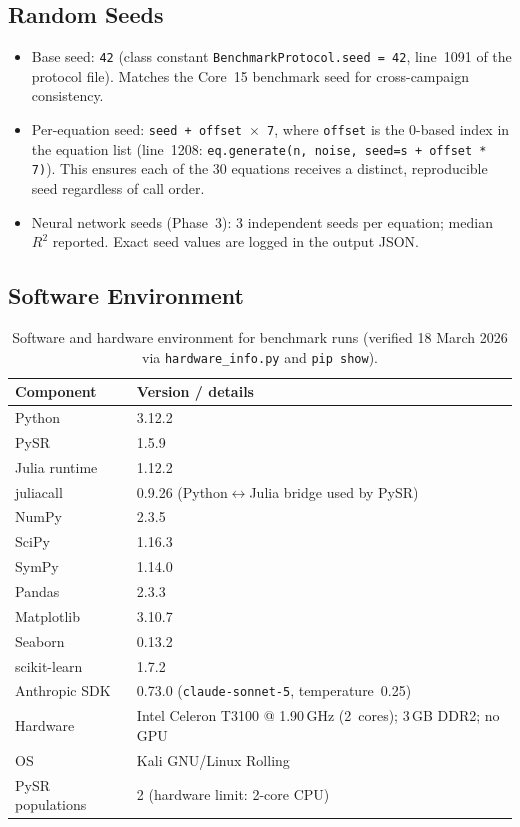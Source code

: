 \documentclass[twoside,11pt]{article}
\begin{document}
\subsection*{Random Seeds}

\begin{itemize}
  \item Base seed: \texttt{42} (class constant
    \texttt{BenchmarkProtocol.seed = 42}, line~1091 of the protocol file).
    Matches the Core~15 benchmark seed for cross-campaign consistency.
  \item Per-equation seed: \texttt{seed + offset $\times$ 7}, where
    \texttt{offset} is the 0-based index in the equation list
    (line~1208: \texttt{eq.generate(n, noise, seed=s + offset * 7)}).
    This ensures each of the 30 equations receives a distinct, reproducible
    seed regardless of call order.
  \item Neural network seeds (Phase~3): 3 independent seeds per equation;
    median $R^2$ reported. Exact seed values are logged in the output JSON.
\end{itemize}

\subsection*{Software Environment}

\begin{table}[H]
\centering
\caption{Software and hardware environment for benchmark runs
         (verified 18 March 2026 via \texttt{hardware\_info.py} and
         \texttt{pip show}).}
\label{tab:software_env}
\small
\begin{tabular}{ll}
\toprule
\textbf{Component} & \textbf{Version / details} \\
\midrule
Python           & 3.12.2 \\
PySR             & 1.5.9 \\
Julia runtime    & 1.12.2 \\
juliacall        & 0.9.26 (Python$\leftrightarrow$Julia bridge used by PySR) \\
NumPy            & 2.3.5 \\
SciPy            & 1.16.3 \\
SymPy            & 1.14.0 \\
Pandas           & 2.3.3 \\
Matplotlib       & 3.10.7 \\
Seaborn          & 0.13.2 \\
scikit-learn     & 1.7.2 \\
Anthropic SDK    & 0.73.0 (\texttt{claude-sonnet-5},
                   temperature~0.25) \\
\midrule
Hardware         & Intel Celeron T3100 @ 1.90\,GHz (2~cores);
                   3\,GB DDR2; no GPU \\
OS               & Kali GNU/Linux Rolling \\
PySR populations & 2 (hardware limit: 2-core CPU) \\
\bottomrule
\end{tabular}
\end{table}
\end{document}
